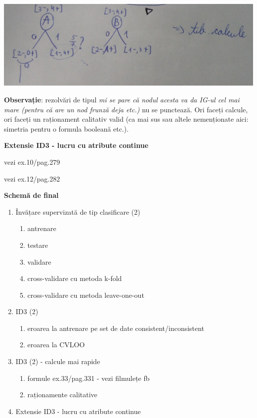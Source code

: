 \documentclass[12pt]{article}
\begin{document}
\begin{enumerate}
\begin{enumerate}
\begin{itemize}
\begin{center}
				\end{center}
				\begin{center}
					\includegraphics[width=1\linewidth]{screenshot008}
				\end{center}
				
			\end{itemize}
		\end{enumerate}
	\end{enumerate}
	
	\textbf{Observație}: rezolvări de tipul \textit{mi se pare că nodul acesta va da IG-ul cel mai mare (pentru că are un nod frunză deja etc.)} nu se punctează. Ori faceți calcule, ori faceți un raționament calitativ valid (ca mai sus sau altele nemenționate aici: simetria pentru o formula booleană etc.).
	
	\textbf{\large{Extensie ID3 - lucru cu atribute continue}}
	
	vezi ex.10/pag.279
	
	vezi ex.12/pag.282
	
	
	\newpage
	\textbf{\large{Schemă de final}}
	\begin{enumerate}
		\item Învățare supervizată de tip clasificare (2)
		\begin{enumerate}
			\item antrenare
			\item testare
			\item validare
			\item cross-validare cu metoda k-fold
			\item cross-validare cu metoda leave-one-out
		\end{enumerate}
		\item ID3 (2)
			\begin{enumerate}
				\item eroarea la antrenare pe set de date consistent/inconsistent
				\item eroarea la CVLOO
			\end{enumerate}
		\item ID3 (2) - calcule mai rapide
			\begin{enumerate}
				\item formule ex.33/pag.331 - vezi filmulețe fb
				\item raționamente calitative
			\end{enumerate}
		\item Extensie ID3 - lucru cu atribute continue
	\end{enumerate}
	
\end{document}
